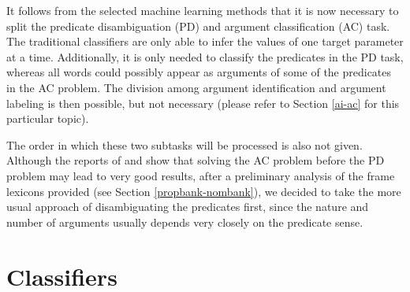 \documentclass[12pt,notitlepage]{report}
\begin{document}
It follows from the selected machine learning methods that it is now necessary to split the predicate disambiguation (PD) and argument classification (AC) task. The traditional classifiers are only able to infer the values of one target parameter at a time. Additionally, it is only needed to classify the predicates in the PD task, whereas all words could possibly appear as arguments of some of the predicates in the AC problem. The division among argument identification and argument labeling is then possible, but not necessary (please refer to Section \ref{ai-ac} for this particular topic). 

The order in which these two subtasks will be processed is also not given. Although the reports of \citet{bohnet09} and \citet{zhao09} show that solving the AC problem before the PD problem may lead to very good results, after a preliminary analysis of the frame lexicons provided (see Section \ref{propbank-nombank}), we decided to take the more usual approach of disambiguating the predicates first, since the nature and number of arguments usually depends very closely on the predicate sense.

\section{Classifiers}\label{classifiers}
\end{document}
